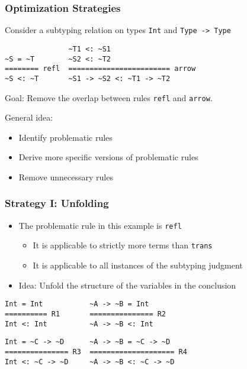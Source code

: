 \documentclass{beamer}
\begin{document}
\begin{frame}[fragile]
  \frametitle{Optimization Strategies}
  \begin{example}
    Consider a subtyping relation on types \texttt{Int} and
    \texttt{Type -> Type}
    \begin{lstlisting}
               ~T1 <: ~S1
~S = ~T        ~S2 <: ~T2  
======== refl  ======================== arrow
~S <: ~T       ~S1 -> ~S2 <: ~T1 -> ~T2
    \end{lstlisting}
    Goal: Remove the overlap between rules \texttt{refl} and
    \texttt{arrow}.\\
  \end{example}
  General idea:
  \begin{itemize}
  \item Identify problematic rules
  \item Derive more specific versions of problematic rules
  \item Remove unnecessary rules
  \end{itemize}
\end{frame}

\begin{frame}[fragile]
  \frametitle{Strategy I: Unfolding}
  \begin{itemize}
  \item The problematic rule in this example is \texttt{refl}
    \begin{itemize}
    \item It is applicable to strictly more terms than \texttt{trans}
    \item It is applicable to all instances of the subtyping judgment
    \end{itemize}
  \item Idea: Unfold the structure of the variables in the conclusion
  \end{itemize}
\begin{lstlisting}
Int = Int           ~A -> ~B = Int 
========== R1       =============== R2
Int <: Int          ~A -> ~B <: Int
\end{lstlisting}
\begin{lstlisting}
Int = ~C -> ~D      ~A -> ~B = ~C -> ~D
=============== R3  ==================== R4
Int <: ~C -> ~D     ~A -> ~B <: ~C -> ~D
\end{lstlisting}
\end{frame}
\end{document}
